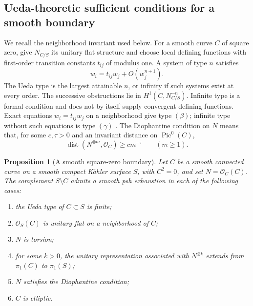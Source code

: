 \documentclass[11pt]{amsart}
\newtheorem{proposition}[theorem]{Proposition}
\theoremstyle{definition}
\theoremstyle{remark}
\numberwithin{equation}{section}
\newcommand{\OO}{\mathcal O}
\begin{document}
\subsection{Ueda-theoretic sufficient conditions for a smooth boundary}

We recall the neighborhood invariant used below.  For a smooth curve
$C$ of square zero, give $N_{C/S}$ its unitary flat structure and
choose local defining functions with first-order transition constants
$t_{ij}$ of modulus one.  A system of type $n$ satisfies
\[
 w_i=t_{ij}w_j+O(w_j^{n+1}).
\]
The Ueda type is the largest attainable $n$, or infinity if such systems
exist at every order.  The successive obstructions lie in
$H^1(C,N_{C/S}^{-n})$.  Infinite type is a formal condition and does
not by itself supply convergent defining functions.  Exact equations
$w_i=t_{ij}w_j$ on a neighborhood give type $(\beta)$; infinite type
without such equations is type $(\gamma)$
\cite[\S\S2,5]{Ueda1983}.
The Diophantine condition on $N$ means that, for some $c,\tau>0$ and
an invariant distance on $\operatorname{Pic}^0(C)$,
\[
 \operatorname{dist}(N^{\otimes m},\OO_C)\ge c m^{-\tau}
 \qquad(m\ge1).
\]

\begin{proposition}[A smooth square-zero boundary]
\label{prop:surface-ueda-sufficient}
Let $C$ be a smooth connected curve on a smooth compact K\"ahler
surface $S$, with $C^2=0$, and set $N=\OO_C(C)$.  The complement
$S\setminus C$ admits a smooth psh exhaustion in each of the
following cases:
\begin{enumerate}[label=\textup{(\roman*)},leftmargin=2.5em]
 \item the Ueda type of $C\subset S$ is finite;
 \item $\OO_S(C)$ is unitary flat on a neighborhood of $C$;
 \item $N$ is torsion;
 \item for some $k>0$, the unitary representation associated with
 $N^{\otimes k}$ extends from $\pi_1(C)$ to $\pi_1(S)$;
 \item $N$ satisfies the Diophantine condition;
 \item $C$ is elliptic.
\end{enumerate}
\end{proposition}
\end{document}
